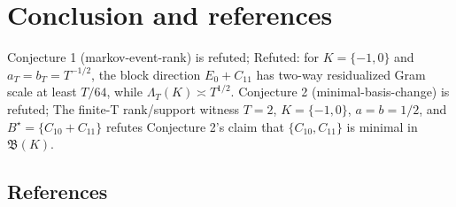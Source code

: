 \documentclass[11pt]{article}
\theoremstyle{definition}
\theoremstyle{plain}
\theoremstyle{remark}
\begin{document}
\section{Conclusion and references}
Conjecture 1 (markov-event-rank) is refuted; Refuted: for \(K=\{-1,0\}\) and \(a_T=b_T=T^{-1/2}\), the block direction \(E_0+C_{11}\) has two-way residualized Gram scale at least \(T/64\), while \(\Lambda_T(K)\asymp T^{1/2}\).
Conjecture 2 (minimal-basis-change) is refuted; The finite-T rank/support witness \(T=2\), \(K=\{-1,0\}\), \(a=b=1/2\), and \(B^\star=\{C_{10}+C_{11}\}\) refutes Conjecture 2's claim that \(\{C_{10},C_{11}\}\) is minimal in \(\mathfrak B(K)\).

\subsection*{References}
\end{document}
